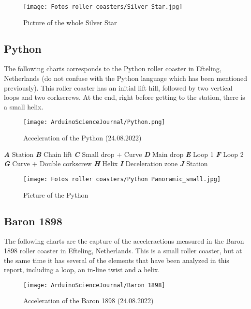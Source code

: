 \documentclass[12pt,twoside,a4paper]{article}
\begin{document}
	\begin{figure}[H]
		\centering
		\texttt{[image: Fotos roller coasters/Silver Star.jpg]}
		\caption{Picture of the whole Silver Star}
		\label{fig:Silver star}
	\end{figure}

	\newpage

	\subsection{Python}
	The following charts corresponds to the Python roller coaster in Efteling, Netherlands (do not confuse with the Python language which has been mentioned previously). This roller coaster has an initial lift hill, followed by two vertical loops and two corkscrews. At the end, right before getting to the station, there is a small helix.
	
	\begin{figure}[H]
		\centering
		\texttt{[image: ArduinoScienceJournal/Python.png]}
		\caption{Acceleration of the Python (24.08.2022)}
		\label{fig:Python acceleration}
	\end{figure}

	{\small\textbf{\textit{A}} Station \textbf{\textit{B}} Chain lift \textbf{\textit{C}} Small drop + Curve \textbf{\textit{D}} Main drop \textbf{\textit{E}} Loop 1 \textbf{\textit{F}} Loop 2	\textbf{\textit{G}} Curve + Double corkscrew \textbf{\textit{H}} Helix \textbf{\textit{I}} Deceleration zone \textbf{\textit{J}} Station}
	
	\begin{figure}[H]
		\centering
		\texttt{[image: Fotos roller coasters/Python Panoramic\_small.jpg]}
		\caption{Picture of the Python}
		\label{fig:Python}
	\end{figure}

	\newpage
	
	\subsection{Baron 1898}
	The following charts are the capture of the acceleractions measured in the Baron 1898 roller coaster in Efteling, Netherlands. This is a small roller coaster, but at the same time it has several of the elements that have been analyzed in this report, including a loop, an in-line twist and a helix.
	
	\begin{figure}[H]
		\centering
		\texttt{[image: ArduinoScienceJournal/Baron 1898]}
		\caption{Acceleration of the Baron 1898 (24.08.2022)}
		\label{fig:Baron acceleration}
	\end{figure}
\end{document}
